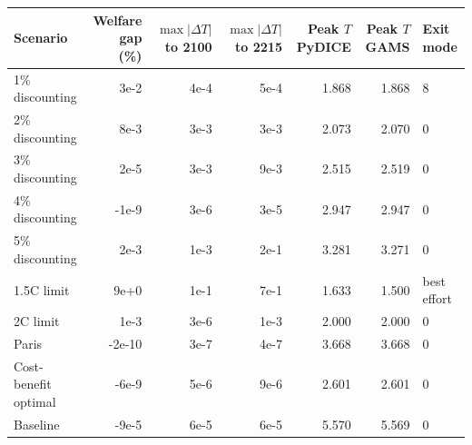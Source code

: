 \begin{tabular}{lrrrrrl}
\toprule
Scenario & Welfare gap (\%) & $\max|\Delta T|$ to 2100 & $\max|\Delta T|$ to 2215 & Peak $T$ PyDICE & Peak $T$ GAMS & Exit mode \\
\midrule
1\% discounting & 3e-2 & 4e-4 & 5e-4 & 1.868 & 1.868 & 8 \\
2\% discounting & 8e-3 & 3e-3 & 3e-3 & 2.073 & 2.070 & 0 \\
3\% discounting & 2e-5 & 3e-3 & 9e-3 & 2.515 & 2.519 & 0 \\
4\% discounting & -1e-9 & 3e-6 & 3e-5 & 2.947 & 2.947 & 0 \\
5\% discounting & 2e-3 & 1e-3 & 2e-1 & 3.281 & 3.271 & 0 \\
1.5\textdegree{}C limit & 9e+0 & 1e-1 & 7e-1 & 1.633 & 1.500 & best effort \\
2\textdegree{}C limit & 1e-3 & 3e-6 & 1e-3 & 2.000 & 2.000 & 0 \\
Paris & -2e-10 & 3e-7 & 4e-7 & 3.668 & 3.668 & 0 \\
Cost-benefit optimal & -6e-9 & 5e-6 & 9e-6 & 2.601 & 2.601 & 0 \\
Baseline & -9e-5 & 6e-5 & 6e-5 & 5.570 & 5.569 & 0 \\
\bottomrule
\end{tabular}
